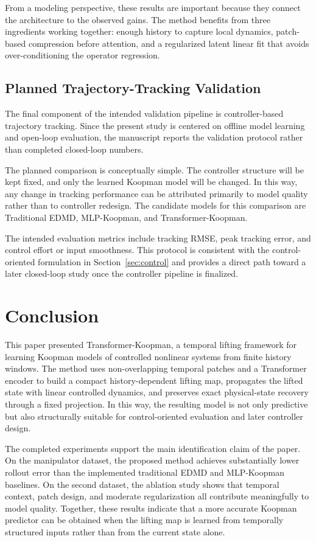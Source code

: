 \documentclass[journal]{IEEEtran}
\begin{document}
From a modeling perspective, these results are important because they connect the architecture to the observed gains. The method benefits from three ingredients working together: enough history to capture local dynamics, patch-based compression before attention, and a regularized latent linear fit that avoids over-conditioning the operator regression.

\subsection{Planned Trajectory-Tracking Validation}

The final component of the intended validation pipeline is controller-based trajectory tracking. Since the present study is centered on offline model learning and open-loop evaluation, the manuscript reports the validation protocol rather than completed closed-loop numbers.

The planned comparison is conceptually simple. The controller structure will be kept fixed, and only the learned Koopman model will be changed. In this way, any change in tracking performance can be attributed primarily to model quality rather than to controller redesign. The candidate models for this comparison are Traditional EDMD, MLP-Koopman, and Transformer-Koopman.

The intended evaluation metrics include tracking RMSE, peak tracking error, and control effort or input smoothness. This protocol is consistent with the control-oriented formulation in Section~\ref{sec:control} and provides a direct path toward a later closed-loop study once the controller pipeline is finalized.

\section{Conclusion}
\label{sec:conclusion}

This paper presented Transformer-Koopman, a temporal lifting framework for learning Koopman models of controlled nonlinear systems from finite history windows. The method uses non-overlapping temporal patches and a Transformer encoder to build a compact history-dependent lifting map, propagates the lifted state with linear controlled dynamics, and preserves exact physical-state recovery through a fixed projection. In this way, the resulting model is not only predictive but also structurally suitable for control-oriented evaluation and later controller design.

The completed experiments support the main identification claim of the paper. On the manipulator dataset, the proposed method achieves substantially lower rollout error than the implemented traditional EDMD and MLP-Koopman baselines. On the second dataset, the ablation study shows that temporal context, patch design, and moderate regularization all contribute meaningfully to model quality. Together, these results indicate that a more accurate Koopman predictor can be obtained when the lifting map is learned from temporally structured inputs rather than from the current state alone.
\end{document}
